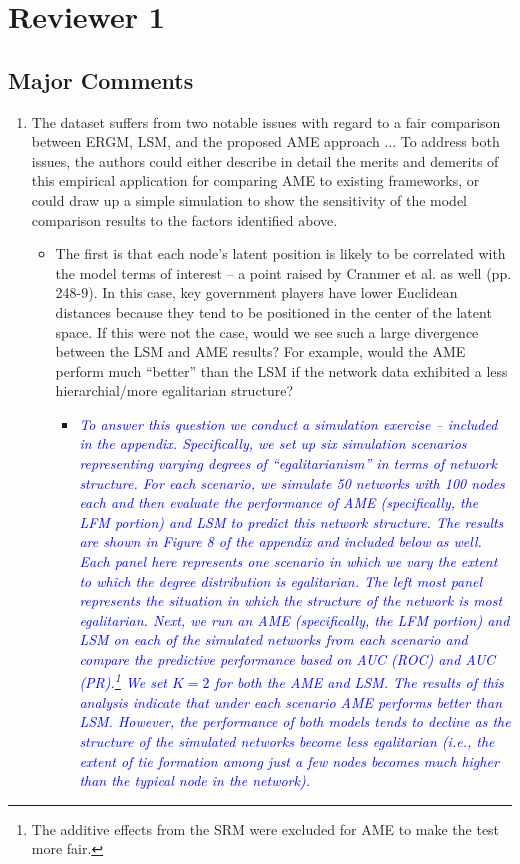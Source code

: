 \section{Reviewer 1}

\subsection{Major Comments}

\begin{enumerate}
	\item  The dataset suffers from two notable issues with regard to a fair comparison between ERGM, LSM, and the proposed AME approach ... To address both issues, the authors could either describe in detail the merits and demerits of this empirical application for comparing AME to existing frameworks, or could draw up a simple simulation to show the sensitivity of the model comparison results to the factors identified above.
	\begin{itemize}
		\item The first is that each node’s latent position is likely to be correlated with the model terms of interest – a point raised by Cranmer et al. as well (pp. 248-9). In this case, key government players have lower Euclidean distances because they tend to be positioned in the center of the latent space. If this were not the case, would we see such a large divergence between the LSM and AME results? For example, would the AME perform much ``better'' than the LSM if the network data exhibited a less hierarchial/more egalitarian structure? 
			\begin{itemize}
				\item \textcolor{blue}{ \emph{
				To answer this question we conduct a simulation exercise -- included in the appendix. Specifically, we set up six simulation scenarios representing varying degrees of ``egalitarianism'' in terms of network structure. For each scenario, we simulate 50 networks with 100 nodes each and then evaluate the performance of AME (specifically, the LFM portion) and LSM to predict this network structure. The results are shown in Figure 8 of the appendix and included below as well. Each panel here represents one scenario in which we vary the extent to which the degree distribution is egalitarian. The left most panel represents the situation in which the structure of the network is most egalitarian. Next, we run an AME (specifically, the LFM portion) and LSM on each of the simulated networks from each scenario and compare the predictive performance based on AUC (ROC) and AUC (PR).\footnote{The additive effects from the SRM were excluded for AME to make the test more fair.} We set $K=2$ for both the AME and LSM. The results of this analysis indicate that under each scenario AME performs better than LSM. However, the performance of both models tends to decline as the structure of the simulated networks become less egalitarian (i.e., the extent of tie formation among just a few nodes becomes much higher than the typical node in the network).  
}}
\end{itemize}
\end{itemize}
\end{enumerate}
